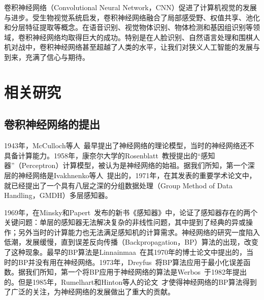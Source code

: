 卷积神经网络（Convolutional Neural Network，CNN）促进了计算机视觉的发展与进步。受生物视觉系统启发，卷积神经网络融合了局部感受野、权值共享、池化和分层特征提取等概念。在语音识别、视觉物体识别、物体检测和基因组识别等领域，卷积神经网络均取得巨大的成功。特别是在人脸识别、自然语言处理和围棋人机对战中，卷积神经网络甚至超越了人类的水平，让我们对狭义人工智能的发展与到来，充满了信心与期待。

\section{相关研究}
\label{sec:relate}

\subsection{卷积神经网络的提出}

1943年，McCulloch等人~\cite{mcculloch1943logical}最早提出了神经网络的理论模型，当时的神经网络还不具备计算能力。1958年，康奈尔大学的Rosenblatt~\cite{rosenblatt1958perceptron}教授提出的“感知器”（Perceptron）计算模型，被认为是神经网络的始祖。据我们所知，第一个深层的神经网络是Ivakhnenko等人~\cite{ivakhnenko1966cybernetic,ivakhnenko1967cybernetics,ivakhnenko1968group,ivakhnenko1971polynomial}提出的，1971年，在其发表的重要学术论文\cite{ivakhnenko1971polynomial}中，就已经提出了一个具有八层之深的分组数据处理（Group Method of Data Handling，GMDH）多层感知器。%

1969年，在Minsky和Papert~\cite{minsky1969perceptrons}发布的新书《感知器》中，论证了感知器存在的两个关键问题：单层的感知器无法解决复杂的非线性问题，其中提到了经典的异或操作；另外当时的计算能力也无法满足感知机的计算需求。神经网络的研究一度陷入低潮，发展缓慢，直到误差反向传播（Backpropagation，BP）算法的出现，改变了这种现象。最早的BP算法是Linnainmaa~\cite{linnainmaa1970representation,linnainmaa1976taylor}在其1970年的博士论文中提出的，当时的BP并没有用在神经网络。1973年，Dreyfus~\cite{dreyfus1973computational}将BP算法应用于最小化误差函数。据我们所知，第一个将BP应用于神经网络的算法是Werbos~\cite{werbos1982applications}于1982年提出的。但是1985年，Rumelhart和Hinton等人的论文~\cite{rumelhart1985learning}才使得神经网络的BP算法得到了广泛的关注，为神经网络的发展做出了重大的贡献。

